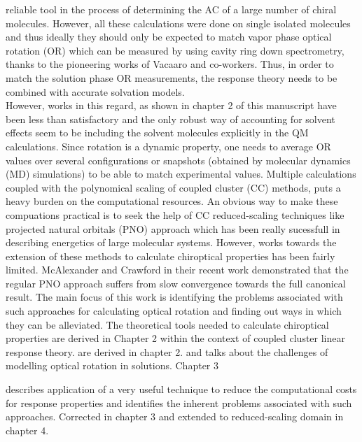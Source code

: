 reliable tool in the process of determining the AC of a large number of chiral molecules\cite{Kondru99}. However, all 
these calculations were done on single isolated molecules and thus ideally they should only be expected to match vapor phase 
optical rotation (OR) which can be measured by using cavity ring down spectrometry, thanks to the pioneering 
works of Vacaaro and co-workers.\cite{} Thus, in order to match the solution phase OR measurements, the response theory
needs to be combined with accurate solvation models. \\ 
However, works in this regard, as shown in chapter 2 of this manuscript have been less than satisfactory and 
the only robust way of accounting for solvent effects seem to be including the solvent molecules explicitly 
in the QM calculations. Since rotation is a dynamic property, one needs to average OR values over several 
configurations or snapshots (obtained by molecular dynamics (MD) simulations) to be able to match experimental 
values. Multiple calculations coupled with the polynomical scaling of coupled cluster (CC) methods, puts a heavy burden 
on the computational resources. An obvious way to make these compuations practical is to seek the help of CC reduced-scaling 
techniques like projected natural orbitals (PNO) approach\cite{} which has been really sucessfull in describing energetics of 
large molecular systems. However, works towards the extension of these methods to calculate chiroptical properties has been 
fairly limited\cite{}. McAlexander and Crawford in their recent work\cite{} demonstrated that the regular PNO approach
suffers from slow convergence towards the full canonical result. The main focus of this work is identifying the problems
associated with such approaches for calculating optical rotation and finding out ways in which they can be alleviated.
The theoretical tools needed to calculate chiroptical properties are derived in Chapter 2 within the context of coupled cluster 
linear response theory.
are derived in chapter 2.
and talks about the challenges of modelling optical rotation in solutions. Chapter 3 


describes application of a very useful 
technique to reduce the computational costs for response properties and identifies the inherent
problems associated with such approaches. Corrected in chapter 3 and extended to reduced-scaling
domain in chapter 4.
